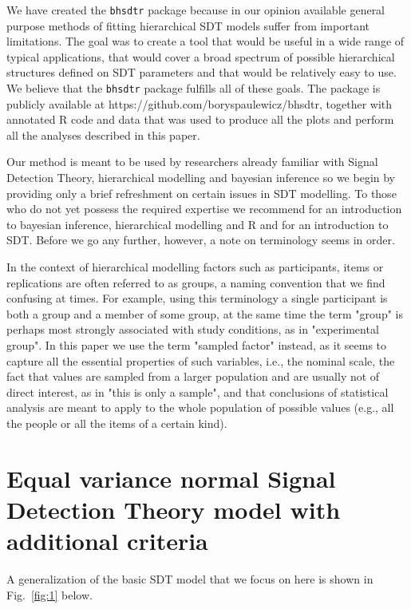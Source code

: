 \documentclass[oneside,a4paper]{article}
\begin{document}
We have created the \texttt{bhsdtr} package because in our opinion
available general purpose methods of fitting hierarchical SDT models
suffer from important limitations. The goal was to create a tool that
would be useful in a wide range of typical applications, that would
cover a broad spectrum of possible hierarchical structures defined on
SDT parameters and that would be relatively easy to use. We believe
that the \texttt{bhsdtr} package fulfills all of these goals. The
package is publicly available at
https://github.com/boryspaulewicz/bhsdtr, together with annotated R
code and data that was used to produce all the plots and perform all
the analyses described in this paper.

Our method is meant to be used by researchers already familiar with
Signal Detection Theory, hierarchical modelling and bayesian inference
so we begin by providing only a brief refreshment on certain issues in
SDT modelling. To those who do not yet possess the required expertise
we recommend  for an introduction to bayesian
inference, hierarchical modelling and R and
 for an introduction to SDT. Before we
go any further, however, a note on terminology seems in order.

In the context of hierarchical modelling factors such as participants,
items or replications are often referred to as groups, a naming
convention that we find confusing at times. For example, using this
terminology a single participant is both a group and a member of some
group, at the same time the term "group" is perhaps most strongly
associated with study conditions, as in "experimental group". In this
paper we use the term "sampled factor" instead, as it seems to capture
all the essential properties of such variables, i.e., the nominal
scale, the fact that values are sampled from a larger population and
are usually not of direct interest, as in "this is only a sample", and
that conclusions of statistical analysis are meant to apply to the
whole population of possible values (e.g., all the people or all the
items of a certain kind).

\section{Equal variance normal Signal Detection Theory model with
  additional criteria}

A generalization of the basic SDT model that we focus on here is shown
in Fig.~\ref{fig:1} below.
\end{document}

